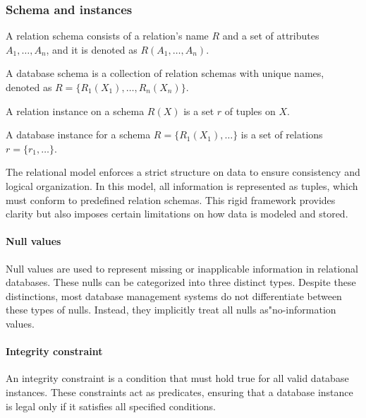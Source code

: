 \subsubsection{Schema and instances}
\begin{definition}
    A relation schema consists of a relation's name $R$ and a set of attributes $A_1, \dots, A_n$, and it is denoted as $R(A_1, \dots, A_n)$. 
\end{definition}
\begin{definition}
    A database schema is a collection of relation schemas with unique names, denoted as $R = \{R_1(X_1), \dots, R_n(X_n)\}$. 
\end{definition}
\begin{definition}
    A relation instance on a schema $R(X)$ is a set $r$ of tuples on $X$.
\end{definition}
\begin{definition}
    A database instance for a schema $R = \{R_1(X_1), \dots\}$ is a set of relations $r = \{r_1, \dots\}$.
\end{definition}
\noindent The relational model enforces a strict structure on data to ensure consistency and logical organization. 
In this model, all information is represented as tuples, which must conform to predefined relation schemas. 
This rigid framework provides clarity but also imposes certain limitations on how data is modeled and stored.

\paragraph*{Null values}
Null values are used to represent missing or inapplicable information in relational databases. 
These nulls can be categorized into three distinct types. 
Despite these distinctions, most database management systems do not differentiate between these types of nulls. 
Instead, they implicitly treat all nulls as"no-information values.

\paragraph*{Integrity constraint}
An integrity constraint is a condition that must hold true for all valid database instances. 
These constraints act as predicates, ensuring that a database instance is legal only if it satisfies all specified conditions.

